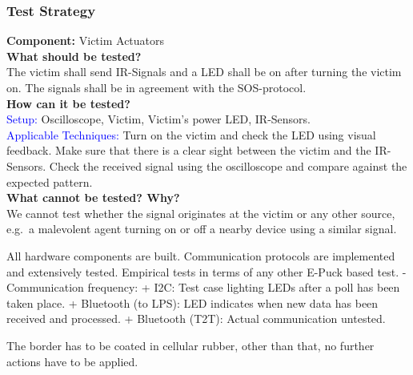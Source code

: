 \documentclass[a4paper,parskip,headheight=38pt]{scrartcl} %
\newcommand{\teststrat}[5]{
    \subsubsection{Test Strategy}
	\textbf{Component:} #1 \\
	\noindent\textbf{What should be tested?} \\
    \noindent #2 \\
	\noindent\textbf{How can it be tested?} \\
    \noindent\textcolor{blue}{Setup:} #3 \\
    \noindent\textcolor{blue}{Applicable Techniques:} #4 \\
	\noindent\textbf{What cannot be tested? Why?} \\
    \noindent #5
}
\begin{document}
\teststrat{Victim Actuators}{
    The victim shall send IR-Signals and a LED shall be on after turning the
    victim on. The signals shall be in agreement with the SOS-protocol.
}{
    Oscilloscope, Victim, Victim's power LED, IR-Sensors.
}{
    Turn on the victim and check the LED using visual feedback. Make sure that
    there is a clear sight between the victim and the IR-Sensors. Check the
    received signal using the oscilloscope and compare against the expected
    pattern.
}{
    We cannot test whether the signal originates at the victim or any other
    source, e.g.\ a malevolent agent turning on or off a nearby device using a
    similar signal.
}


All hardware
components are built. Communication protocols are
implemented and extensively tested. Empirical tests in terms of any other E-Puck
based test. - Communication frequency:    + I2C: Test case lighting LEDs after a
poll has been taken place.   + Bluetooth (to LPS): LED indicates when new data
has been received and processed.   + Bluetooth (T2T): Actual communication
untested.

The border has to be coated in cellular rubber, other than that, no further actions have to be applied.
\end{document}
